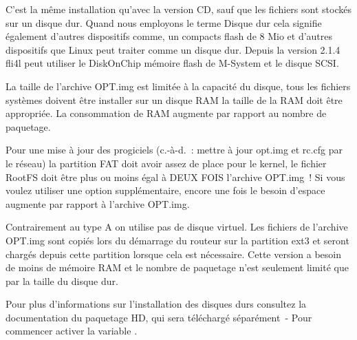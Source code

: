 C'est la même installation qu'avec la version CD, sauf que les fichiers sont stockés
sur un disque dur. Quand nous employons le terme \flqq{}Disque dur\frqq{} cela signifie
également d'autres dispositifs comme, un compacts flash de 8 Mio et d'autres
dispositifs que Linux peut traiter comme un disque dur. Depuis la version 2.1.4
fli4l peut utiliser le DiskOnChip mémoire flash de M-System et le disque SCSI.

La taille de l'archive OPT.img est limitée à la capacité du disque, tous les
fichiers systèmes doivent être installer sur un disque RAM la taille de la RAM
doit être appropriée. La consommation de RAM augmente par rapport au nombre de
paquetage.

Pour une mise à jour des progiciels (c.-à-d.~: mettre à jour opt.img et rc.cfg par
le réseau) la partition FAT doit avoir assez de place pour le kernel, le fichier
RootFS doit être plus ou moins égal à DEUX FOIS l'archive OPT.img~! Si vous voulez
utiliser une option supplémentaire, encore une fois le besoin d'espace augmente par
rapport à l'archive OPT.img.



Contrairement au type A on utilise pas de disque virtuel. Les fichiers de l'archive
OPT.img sont copiés lors du démarrage du routeur sur la partition ext3 et seront
chargés depuis cette partition lorsque cela est nécessaire. Cette version a besoin
de moins de mémoire RAM et le nombre de paquetage n'est seulement limité que par
la taille du disque dur.

Pour plus d'informations sur l'installation des disques durs consultez la
documentation du paquetage HD, qui sera téléchargé séparément~- Pour commencer
activer la variable .
